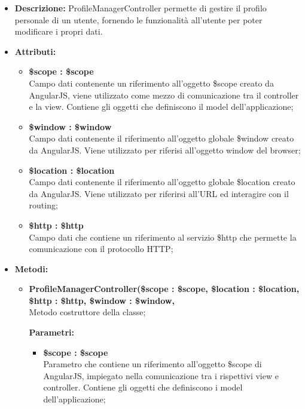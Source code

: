 \begin{itemize}
	\item \textbf{Descrizione:} ProfileManagerController permette di gestire il profilo personale di un
	utente, fornendo le funzionalità all'utente per poter modificare i propri dati.
	\item \textbf{Attributi:}
	\begin{itemize}
		
		\item \textbf{\$scope : \$scope}\\
		Campo dati contenente un riferimento all'oggetto \$scope creato da AngularJS, viene utilizzato come mezzo di comunicazione tra il controller e la view. Contiene gli oggetti che definiscono il model dell'applicazione;
		
		\item \textbf{\$window : \$window}\\
		Campo dati contenente il riferimento all'oggetto globale \$window creato da AngularJS. Viene utilizzato per riferisi all'oggetto window del browser;
		
		\item \textbf{\$location : \$location }\\
		Campo dati contenente il riferimento all'oggetto globale \$location creato da AngularJS. Viene utilizzato per riferirsi all'URL ed interagire con il routing;
		
		\item \textbf{\$http : \$http }\\
		Campo dati che contiene un riferimento al servizio \$http che permette la comunicazione con il protocollo HTTP;
		
		
	\end{itemize}
	\item \textbf{Metodi:}
	\begin{itemize}
		
		\item \textbf{ProfileManagerController(\$scope : \$scope, \$location : \$location, \$http : \$http, \$window : \$window,}\\
		Metodo costruttore della classe;
		\begin{description}
			\item[\textbf{Parametri:}]
		\end{description}
		\begin{itemize}
			\item \textbf{\$scope : \$scope}\\
			Parametro che contiene un riferimento all'oggetto \$scope di AngularJS, impiegato nella comunicazione tra i rispettivi view e controller. Contiene gli oggetti che definiscono i model dell'applicazione;
			

\end{itemize}
\end{itemize}
\end{itemize}
